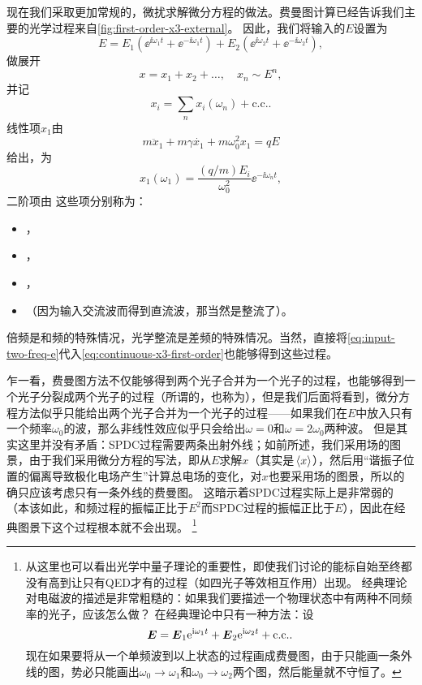 现在我们采取更加常规的，微扰求解微分方程的做法。费曼图计算已经告诉我们主要的光学过程来自\autoref{fig:first-order-x3-external}。
因此，我们将输入的$E$设置为
\begin{equation}
    E = E_1 (\ee^{\ii \omega_1 t} + \ee^{-\ii \omega_1 t}) + E_2 (\ee^{\ii \omega_2 t} + \ee^{-\ii \omega_2 t}), 
    \label{eq:input-two-freq-e}
\end{equation}
做展开
\begin{equation}
    x = x_1 + x_2 + \ldots, \quad x_n \sim E^{n },
\end{equation}
并记
\begin{equation}
    x_i = \sum_n x_i(\omega_n) + \text{c.c.}.
\end{equation}
线性项$x_1$由
\[
    m \ddot{x}_1 + m \gamma \dot{x_1} +  m \omega_0^2 x_1 = q E
\]
给出，为
\begin{equation}
    x_1(\omega_1) = \frac{(q/m) E_i}{\omega_0^2 } \ee^{-\ii \omega_n t},
\end{equation}
二阶项由
这些项分别称为：
\begin{itemize}
    \item {}，
    \item {}，
    \item {}，
    \item {}（因为输入交流波而得到直流波，那当然是整流了）。
\end{itemize}
倍频是和频的特殊情况，光学整流是差频的特殊情况。当然，直接将\eqref{eq:input-two-freq-e}代入\eqref{eq:continuous-x3-first-order}也能够得到这些过程。

乍一看，费曼图方法不仅能够得到两个光子合并为一个光子的过程，也能够得到一个光子分裂成两个光子的过程（所谓的，也称为），但是我们后面将看到，微分方程方法似乎只能给出两个光子合并为一个光子的过程——如果我们在$E$中放入只有一个频率$\omega_0$的波，那么非线性效应似乎只会给出$\omega=0$和$\omega=2\omega_0$两种波。
但是其实这里并没有矛盾：SPDC过程需要两条出射外线；如前所述，我们采用场的图景，由于我们采用微分方程的写法，即从$E$求解$x$（其实是$\expval*{x}$），然后用“谐振子位置的偏离导致极化电场产生”计算总电场的变化，对$x$也要采用场的图景，所以的确只应该考虑只有一条外线的费曼图。
这暗示着SPDC过程实际上是非常弱的（本该如此，和频过程的振幅正比于$E^2$而SPDC过程的振幅正比于$E$），因此在经典图景下这个过程根本就不会出现。%
\footnote{
    从这里也可以看出光学中量子理论的重要性，即使我们讨论的能标自始至终都没有高到让只有QED才有的过程（如四光子等效相互作用）出现。
    经典理论对电磁波的描述是非常粗糙的：如果我们要描述一个物理状态中有两种不同频率的光子，应该怎么做？
    在经典理论中只有一种方法：设
    \[
        \vb*{E} = \vb*{E}_1 \mathrm{e}^{\mathrm{i} \omega_1 t} + \vb*{E}_2 \mathrm{e}^{\mathrm{i} \omega_2 t} + \text{c.c.}.
    \]
    现在如果要将从一个单频波到以上状态的过程画成费曼图，由于只能画一条外线的图，势必只能画出$\omega_0 \to \omega_1$和$\omega_0 \to \omega_2$两个图，然后能量就不守恒了。
}%

